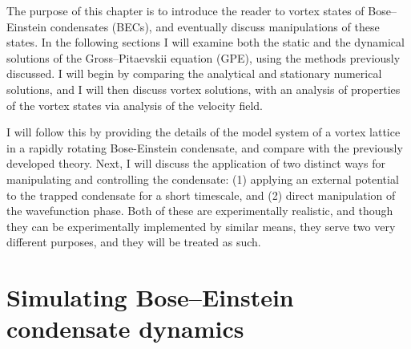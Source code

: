 The purpose of this chapter is to introduce the reader to vortex states of Bose--Einstein condensates (BECs), and eventually discuss manipulations of these states. In the following sections I will examine both the static and the dynamical solutions of the Gross--Pitaevskii equation (GPE), using the methods previously discussed. I will begin by comparing the analytical and stationary numerical solutions, and I will then discuss vortex solutions, with an analysis of properties of the vortex states via analysis of the velocity field.

I will follow this by providing the details of the model system of a vortex lattice in a rapidly rotating Bose-Einstein condensate, and compare with the previously developed theory. Next, I will discuss the application of two distinct ways for manipulating and controlling the condensate: (1) applying an external potential to the trapped condensate for a short timescale, and (2) direct manipulation of the wavefunction phase. Both of these are experimentally realistic, and though they can be experimentally implemented by similar means, they serve two very different purposes, and they will be treated as such.

\section{Simulating Bose--Einstein condensate dynamics}

